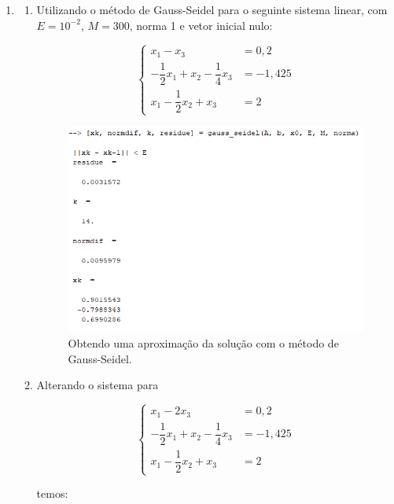 \documentclass[11pt]{article}
\begin{document}
\begin{enumerate}
\begin{enumerate}
\end{enumerate}

\item

\begin{enumerate}
    \item Utilizando o método de Gauss-Seidel para o seguinte sistema linear, com $E = 10^{-2}$, $M = 300$, norma 1 e vetor inicial nulo:
    
    $$\begin{cases}
    x_1 - x_3 &= 0,2 \\
    -\dfrac{1}{2}x_1 +x_2 - \dfrac{1}{4}x_3 &= -1,425 \\
    x_1-\dfrac{1}{2}x_2+x_3 &= 2
    \end{cases}$$

    \begin{figure}[H]
    \centering
    \includegraphics[]{5-a}
    \caption{Obtendo uma aproximação da solução com o método de Gauss-Seidel.}
    \end{figure}
    
    \item Alterando o sistema para 
    
    $$\begin{cases}
    x_1 - 2x_3 &= 0,2 \\
    -\dfrac{1}{2}x_1 +x_2 - \dfrac{1}{4}x_3 &= -1,425 \\
    x_1-\dfrac{1}{2}x_2+x_3 &= 2
    \end{cases}$$
    
    temos:


\end{enumerate}
\end{enumerate}
\end{document}
